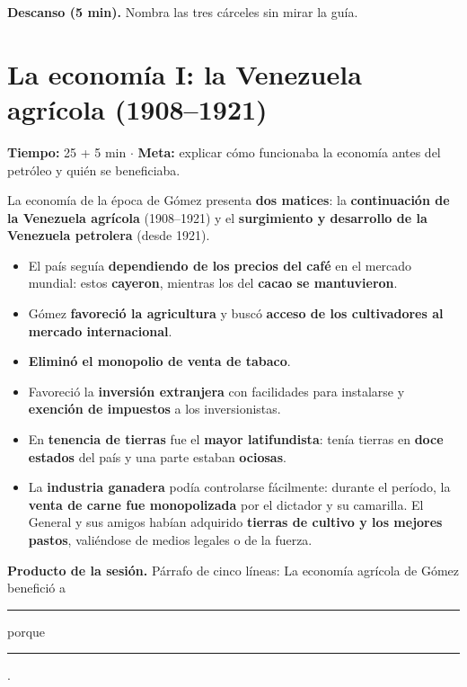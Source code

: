 \documentclass[12pt, letterpaper]{article}
\makeatletter
\let\mw@oldsection\section
\newcommand{\mw@prepage}{%
  \par
  \ifdim\pagegoal=\maxdimen\else
    \ifdim\dimexpr\pagegoal-\pagetotal\relax<7cm\relax
      \newpage
    \fi
  \fi}
\renewcommand{\section}{\mw@prepage\mw@oldsection}
\newcommand{\metasesion}[2]{%
  \begin{cabecerasesion}
    \small
    \textbf{\color{mwprimario}Tiempo:} #1 \quad$\cdot$\quad
    \textbf{\color{mwprimario}Meta:} #2
  \end{cabecerasesion}%
}
\newcommand{\pausa}[1]{%
  \begin{descanso}
    \small\textbf{\color{mwnaranja}Descanso (5 min).} #1
  \end{descanso}%
}
\makeatother
\begin{document}
\pausa{Nombra las tres cárceles sin mirar la guía.}

\section{La economía I: la Venezuela agrícola (1908--1921)}

\metasesion{25 + 5 min}{explicar cómo funcionaba la economía antes del petróleo
y quién se beneficiaba.}

La economía de la época de Gómez presenta \textbf{dos matices}: la
\textbf{continuación de la Venezuela agrícola} (1908--1921) y el
\textbf{surgimiento y desarrollo de la Venezuela petrolera} (desde 1921).

\begin{itemize}[leftmargin=*, itemsep=3pt]
  \item El país seguía \textbf{dependiendo de los precios del café} en el mercado
        mundial: estos \textbf{cayeron}, mientras los del \textbf{cacao se
        mantuvieron}.
  \item Gómez \textbf{favoreció la agricultura} y buscó \textbf{acceso de los
        cultivadores al mercado internacional}.
  \item \textbf{Eliminó el monopolio de venta de tabaco}.
  \item Favoreció la \textbf{inversión extranjera} con facilidades para
        instalarse y \textbf{exención de impuestos} a los inversionistas.
  \item En \textbf{tenencia de tierras} fue el \textbf{mayor latifundista}:
        tenía tierras en \textbf{doce estados} del país y una parte estaban
        \textbf{ociosas}.
  \item La \textbf{industria ganadera} podía controlarse fácilmente: durante el
        período, la \textbf{venta de carne fue monopolizada} por el dictador y
        su camarilla. El General y sus amigos habían adquirido \textbf{tierras
        de cultivo y los mejores pastos}, \guillemotleft valiéndose de medios
        legales o de la fuerza\guillemotright.
\end{itemize}

\begin{cuadropasos}
  \small
  \textbf{Producto de la sesión.} Párrafo de cinco líneas:
  \guillemotleft La economía agrícola de Gómez benefició a
  \rule{1.8cm}{0.4pt} porque \rule{3.2cm}{0.4pt}\guillemotright.
\end{cuadropasos}
\end{document}
